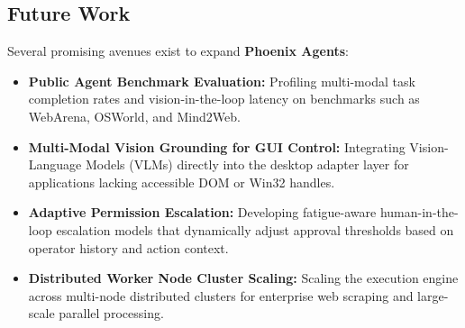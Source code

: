 \documentclass[conference]{IEEEtran}
\begin{document}
\subsection{Future Work}
Several promising avenues exist to expand \textbf{Phoenix Agents}:
\begin{itemize}
    \item \textbf{Public Agent Benchmark Evaluation:} Profiling multi-modal task completion rates and vision-in-the-loop latency on benchmarks such as WebArena, OSWorld, and Mind2Web.
    \item \textbf{Multi-Modal Vision Grounding for GUI Control:} Integrating Vision-Language Models (VLMs) directly into the desktop adapter layer for applications lacking accessible DOM or Win32 handles.
    \item \textbf{Adaptive Permission Escalation:} Developing fatigue-aware human-in-the-loop escalation models that dynamically adjust approval thresholds based on operator history and action context.
    \item \textbf{Distributed Worker Node Cluster Scaling:} Scaling the execution engine across multi-node distributed clusters for enterprise web scraping and large-scale parallel processing.
\end{itemize}
\end{document}
